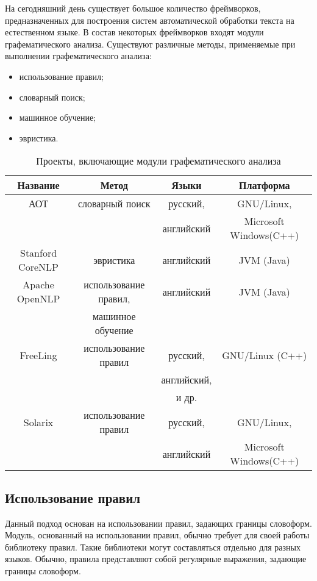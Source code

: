 На сегодняшний день существует большое количество фреймворков, предназначенных для построения систем автоматической обработки текста на естественном языке. В состав некоторых фреймворков входят модули графематического анализа. Существуют различные методы, применяемые при выполнении графематического анализа:

\begin{itemize}
\item
использование правил;
\item
словарный поиск;
\item
машинное обучение;
\item
эвристика.
\end{itemize}

\begin{table}[H] \small
	\centering
	\label{t:thyp_gd1}
	\begin{tabular}{ | c | c | c | c |}
		\hline
		Название 							& Метод 				& Языки 		& Платформа 				\\ \hline
		АОТ\cite{web.aot}					& словарный поиск		& русский,		& GNU/Linux,			\\
											&						& английский	& Microsoft Windows(C++)\\ \hline
		Stanford CoreNLP\cite{web.corenlp}	& эвристика				& английский	& JVM (Java)			\\ \hline
		Apache OpenNLP\cite{web.opennlp}	& использование правил,	& английский	& JVM (Java)			\\
											& машинное обучение		& 				&						\\ \hline
		FreeLing\cite{web.freeling}			& использование правил	& русский,		& GNU/Linux (C++)		\\
											&						& английский,	&						\\
											&						& и др.			&						\\ \hline
		Solarix\cite{web.solarix}			& использование правил	& русский,		& GNU/Linux,			\\ 
											&						& английский	& Microsoft Windows(C++)\\
		\hline
	\end{tabular}
	\caption{Проекты, включающие модули графематического анализа}
\end{table}

\subsection{Использование правил}
Данный подход основан на использовании правил, задающих границы словоформ. Модуль, основанный на использовании правил, обычно требует для своей работы библиотеку правил. Такие библиотеки могут составляться отдельно для разных языков. Обычно, правила представляют собой регулярные выражения, задающие границы словоформ.


